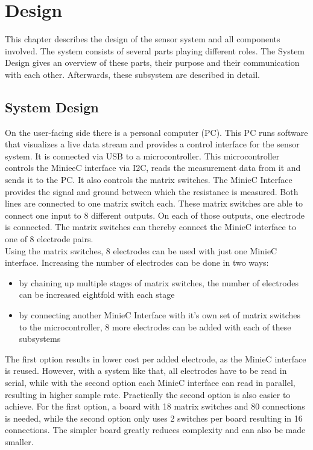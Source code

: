 \chapter{Design}

This chapter describes the design of the sensor system and all components involved. The system consists of several parts playing different roles. The System Design gives an overview of these parts, their purpose and their communication with each other. Afterwards, these subsystem are described in detail.\\

\section{System Design}

On the user-facing side there is a personal computer (PC). This PC runs software that visualizes a live data stream and provides a control interface for the sensor system. It is connected via USB to a microcontroller. This microcontroller controls the MinieeC interface via I2C, reads the measurement data from it and sends it to the PC. It also controls the matrix switches. The MinieC Interface provides the signal and ground between which the resistance is measured. Both lines are connected to one matrix switch each. These matrix switches are able to connect one input to 8 different outputs. On each of those outputs, one electrode is connected. The matrix switches can thereby connect the MinieC interface to one of 8 electrode pairs. \\

Using the matrix switches, 8 electrodes can be used with just one MinieC interface. Increasing the number of electrodes can be done in two ways:

\begin{itemize}
    \item by chaining up multiple stages of matrix switches, the number of electrodes can be increased eightfold with each stage
    \item by connecting another MinieC Interface with it's own set of matrix switches to the microcontroller, 8 more electrodes can be added with each of these subsystems
\end{itemize}

The first option results in lower cost per added electrode, as the MinieC interface is reused. However, with a system like that, all electrodes have to be read in serial, while with the second option each MinieC interface can read in parallel, resulting in higher sample rate. Practically the second option is also easier to achieve. For the first option, a board with 18 matrix switches and 80 connections is needed, while the second option only uses 2 switches per board resulting in 16 connections. The simpler board greatly reduces complexity and can also be made smaller.

